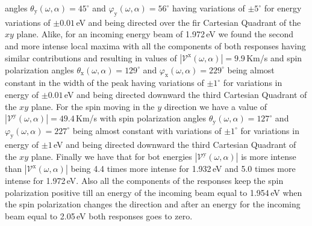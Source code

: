 \documentclass[prb,11pt,tightenlines,twocolumn,aps]{revtex4-1}
\begin{document}
angles $\theta_{\mathrm{y}}(\omega,\alpha)=45^{\circ}$ and
$\varphi_{\mathrm{y}}(\omega,\alpha)=56^{\circ}$ having variations of
$\pm5^{\circ}$ for energy variations of $\pm0.01$\,eV and being directed over
the fir Cartesian Quadrant of the $xy$ plane.
% 
Alike, for an incoming energy beam of 1.972\,eV we found the second and more
intense local maxima with all the components of both responses having similar
contributions and resulting in values of
$|\mathcal{V}^{\mathrm{x}}(\omega,\alpha)|=9.9$\,Km/s and spin polarization
angles $\theta_{\mathrm{x}}(\omega,\alpha)=129^{\circ}$ and
$\varphi_{\mathrm{x}}(\omega,\alpha)=229^{\circ}$ being almost constant in the
width of the peak having variations of $\pm1^{\circ}$ for variations in energy
of $\pm0.01$\,eV and being directed downward the third Cartesian Quadrant of the
$xy$ plane.
% 
For the spin moving in the $y$ direction we have a value of
$|\mathcal{V}^{\mathrm{y}}(\omega,\alpha)|=49.4$\,Km/s with spin polarization
angles $\theta_{\mathrm{y}}(\omega,\alpha)=127^{\circ}$ and
$\varphi_{\mathrm{y}}(\omega,\alpha)=227^{\circ}$ being almost constant with
variations of $\pm1^{\circ}$ for variations in energy of $\pm1$\,eV and being
directed downward the third Cartesian Quadrant of the $xy$ plane.
% 
Finally we have that for bot energies
$|\mathcal{V}^{\mathrm{y}}(\omega,\alpha)|$ is more intense than
$|\mathcal{V}^{\mathrm{x}}(\omega,\alpha)|$ being 4.4 times more intense for
1.932\,eV and 5.0 times more intense for 1.972\,eV. Also all the components of
the responses keep the spin polarization positive till an energy of the incoming
beam equal to 1.954\,eV when the spin polarization changes the direction and
after an energy for the incoming beam equal to 2.05\,eV both responses goes to
zero.

\end{document}
